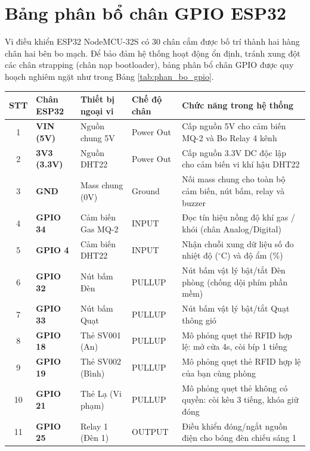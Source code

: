 \section{Bảng phân bổ chân GPIO ESP32}
\label{sec:bang_phan_bo_gpio}

Vi điều khiển ESP32 NodeMCU-32S có 30 chân cắm được bố trí thành hai hàng chân hai bên bo mạch. Để bảo đảm hệ thống hoạt động ổn định, tránh xung đột các chân strapping (chân nạp bootloader), bảng phân bổ chân GPIO được quy hoạch nghiêm ngặt như trong Bảng \ref{tab:phan_bo_gpio}.

\begin{table}[H]
\centering
\small
\begin{tabularx}{\textwidth}{|c|p{2.2cm}|p{2.5cm}|p{2.0cm}|X|}
\hline
\textbf{STT} & \textbf{Chân ESP32} & \textbf{Thiết bị ngoại vi} & \textbf{Chế độ chân} & \textbf{Chức năng trong hệ thống} \\
\hline
1 & \textbf{VIN (5V)} & Nguồn chung 5V & Power Out & Cấp nguồn 5V cho cảm biến MQ-2 và Bo Relay 4 kênh \\
\hline
2 & \textbf{3V3 (3.3V)} & Nguồn DHT22 & Power Out & Cấp nguồn 3.3V DC độc lập cho cảm biến vi khí hậu DHT22 \\
\hline
3 & \textbf{GND} & Mass chung (0V) & Ground & Nối mass chung cho toàn bộ cảm biến, nút bấm, relay và buzzer \\
\hline
4 & \textbf{GPIO 34} & Cảm biến Gas MQ-2 & INPUT & Đọc tín hiệu nồng độ khí gas / khói (chân Analog/Digital) \\
\hline
5 & \textbf{GPIO 4} & Cảm biến DHT22 & INPUT & Nhận chuỗi xung dữ liệu số đo nhiệt độ ($^\circ\text{C}$) và độ ẩm (\%) \\
\hline
6 & \textbf{GPIO 32} & Nút bấm Đèn & PULLUP & Nút bấm vật lý bật/tắt Đèn phòng (chống dội phím phần mềm) \\
\hline
7 & \textbf{GPIO 33} & Nút bấm Quạt & PULLUP & Nút bấm vật lý bật/tắt Quạt thông gió \\
\hline
8 & \textbf{GPIO 18} & Thẻ SV001 (An) & PULLUP & Mô phỏng quẹt thẻ RFID hợp lệ: mở cửa 4s, còi bíp 1 tiếng \\
\hline
9 & \textbf{GPIO 19} & Thẻ SV002 (Bình) & PULLUP & Mô phỏng quẹt thẻ RFID hợp lệ của bạn cùng phòng \\
\hline
10 & \textbf{GPIO 21} & Thẻ Lạ (Vi phạm) & PULLUP & Mô phỏng quẹt thẻ không có quyền: còi kêu 3 tiếng, khóa giữ đóng \\
\hline
11 & \textbf{GPIO 25} & Relay 1 (Đèn 1) & OUTPUT & Điều khiển đóng/ngắt nguồn điện cho bóng đèn chiếu sáng 1 \\

\end{tabularx}
\end{table}
